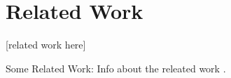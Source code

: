 \section{Related Work}
\label{section:relatedwork}
[related work here]

\begin{description}
  \item{Some Related Work:} Info about the releated work \cite{JML:J832}.
\end{description}

